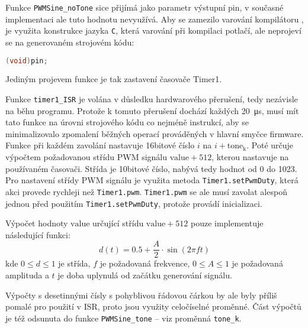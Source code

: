 Funkce \verb|PWMSine_noTone| sice přijímá jako parametr výstupní pin,
v současné implementaci ale tuto hodnotu nevyužívá. Aby se zamezilo varování
kompilátoru  , je využita konstrukce jazyka
\texttt{C}, která varování při kompilaci potlačí, ale neprojeví se na
generovaném strojovém kódu:
\begin{lstlisting}[language=C]
(void)pin;
\end{lstlisting}
Jediným projevem funkce je tak zastavení časovače Timer1.

Funkce \verb|timer1_ISR| je volána v důsledku hardwarového přerušení,
tedy nezávisle na běhu programu. Protože k tomuto přerušení dochází každých
\SI{20}{\micro\second}, musí mít tato funkce na úrovni strojového kódu co
nejméně instrukcí, aby se minimalizovalo zpomalení běžných operací prováděných
v hlavní smyčce firmware. Funkce při každém zavolání nastavuje 16bitové číslo
$i$ na $i + \mathrm{tone_k}$. Poté určuje výpočtem požadovanou střídu PWM
signálu $\mathrm{value}+512$, kterou nastavuje na používaném časovači. Střída
je 10bitové číslo, nabývá tedy hodnot od \num{0} do \num{1023}. Pro nastavení
střídy PWM signálu je využita metoda \texttt{Timer1.setPwmDuty}, která akci
provede rychleji než \texttt{Timer1.pwm}. \texttt{Timer1.pwm} se ale musí
zavolat alespoň jednou před použitím \texttt{Timer1.setPwmDuty}, protože
provádí inicializaci.~\cite[ověřeno praktickým pokusem]{TimerOnedocs}

Výpočet hodnoty $\mathrm{value}$ určující střídu $\mathrm{value}+512$ pouze
implementuje následující funkci:
\begin{equation}
    d(t) = \num{0,5} + \frac{A}{2} \cdot \sin{(2\pi f t)}
    \label{eq:duty float}
\end{equation}
kde $0 \le d \le 1$ je střída, $f$ je požadovaná frekvence, $0 \le A \le 1$ je
požadovaná amplituda a $t$ je doba uplynulá od začátku generování signálu.

Výpočty s desetinnými čísly s pohyblivou řádovou čárkou by ale byly příliš
pomalé pro použití v ISR, proto jsou využity celočíselné proměnné. Část
výpočtů je též odsunuta do funkce \verb|PWMSine_tone| -- viz proměnná
\verb|tone_k|.


